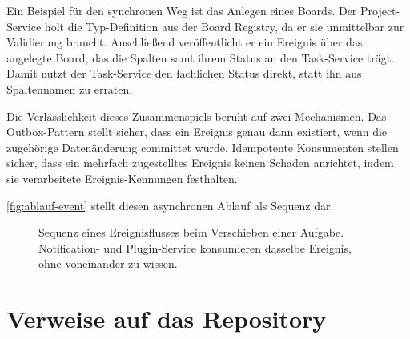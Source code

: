 Ein Beispiel für den synchronen Weg ist das Anlegen eines Boards. Der Project-Service holt die Typ-Definition aus der Board Registry, da er sie unmittelbar zur Validierung braucht. Anschließend veröffentlicht er ein Ereignis über das angelegte Board, das die Spalten samt ihrem Status an den Task-Service trägt. Damit nutzt der Task-Service den fachlichen Status direkt, statt ihn aus Spaltennamen zu erraten.

Die Verlässlichkeit dieses Zusammenspiels beruht auf zwei Mechanismen. Das Outbox-Pattern stellt sicher, dass ein Ereignis genau dann existiert, wenn die zugehörige Datenänderung committet wurde. Idempotente Konsumenten stellen sicher, dass ein mehrfach zugestelltes Ereignis keinen Schaden anrichtet, indem sie verarbeitete Ereignis-Kennungen festhalten.

\vref{fig:ablauf-event} stellt diesen asynchronen Ablauf als Sequenz dar.

\begin{figure}[ht]
  \centering
  \caption{Sequenz eines Ereignisflusses beim Verschieben einer Aufgabe. Notification- und Plugin-Service konsumieren dasselbe Ereignis, ohne voneinander zu wissen.}
  \label{fig:ablauf-event}
\end{figure}

\section{Verweise auf das Repository}
\label{sec:repository-verweise}

